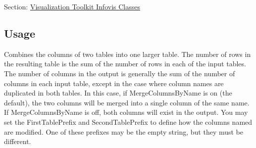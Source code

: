 Section\-: \hyperlink{sec_vtkinfovis}{Visualization Toolkit Infovis Classes} \hypertarget{vtkwidgets_vtkxyplotwidget_Usage}{}\subsection{Usage}\label{vtkwidgets_vtkxyplotwidget_Usage}
Combines the columns of two tables into one larger table. The number of rows in the resulting table is the sum of the number of rows in each of the input tables. The number of columns in the output is generally the sum of the number of columns in each input table, except in the case where column names are duplicated in both tables. In this case, if Merge\-Columns\-By\-Name is on (the default), the two columns will be merged into a single column of the same name. If Merge\-Columns\-By\-Name is off, both columns will exist in the output. You may set the First\-Table\-Prefix and Second\-Table\-Prefix to define how the columns named are modified. One of these prefixes may be the empty string, but they must be different.

